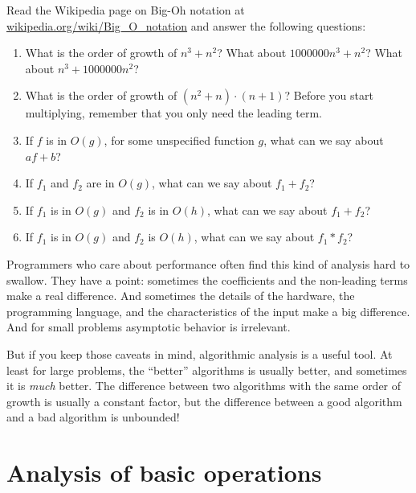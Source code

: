 \documentclass[10pt]{book}
\begin{document}
\begin{exercise}

Read the Wikipedia page on Big-Oh notation at
\url{wikipedia.org/wiki/Big_O_notation} and
answer the following questions:

\begin{enumerate}

\item What is the order of growth of $n^3 + n^2$?
What about $1000000 n^3 + n^2$?
What about $n^3 + 1000000 n^2$?

\item What is the order of growth of $(n^2 + n) \cdot (n + 1)$?  Before
  you start multiplying, remember that you only need the leading term.

\item If $f$ is in $O(g)$, for some unspecified function $g$, what can
  we say about $a f + b$?

\item If $f_1$ and $f_2$ are in $O(g)$, what can we say about $f_1 + f_2$?

\item If  $f_1$ is in $O(g)$
and $f_2$ is in $O(h)$,
what can we say about  $f_1 + f_2$?

\item If  $f_1$ is in $O(g)$ and $f_2$ is $O(h)$,
what can we say about  $f_1 * f_2$?

\end{enumerate}

\end{exercise}


Programmers who care about performance often find this kind of
analysis hard to swallow.  They have a point: sometimes the
coefficients and the non-leading terms make a real difference.  And
sometimes the details of the hardware, the programming language, and
the characteristics of the input make a big difference.  And for small
problems asymptotic behavior is irrelevant.

But if you keep those caveats in mind, algorithmic analysis is a
useful tool.  At least for large problems, the ``better'' algorithms
is usually better, and sometimes it is {\em much} better.  The
difference between two algorithms with the same order of growth is
usually a constant factor, but the difference between a good algorithm
and a bad algorithm is unbounded!


\section{Analysis of basic operations}
\end{document}
